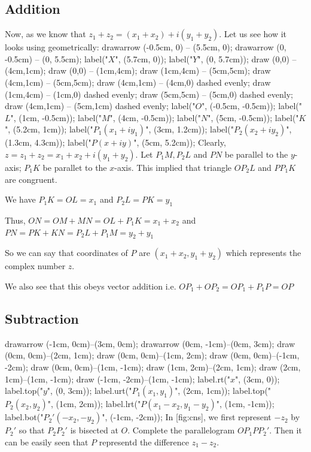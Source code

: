 \subsection{Addition}
Now, as we know that $z_1 + z_2 = (x_1 + x_2) + i(y_1 + y_2)$. Let us see how it looks using geometrically:
\startplacefigure[title=Complex numbers addition]
  \startMPcode
    drawarrow (-0.5cm, 0) -- (5.5cm, 0);
    drawarrow (0, -0.5cm) -- (0, 5.5cm);
    label("$X$", (5.7cm, 0));
    label("$Y$", (0, 5.7cm));
    draw (0,0) -- (4cm,1cm);
    draw (0,0) -- (1cm,4cm);
    draw (1cm,4cm) -- (5cm,5cm);
    draw (4cm,1cm) -- (5cm,5cm);
    draw (4cm,1cm) -- (4cm,0) dashed evenly;
    draw (1cm,4cm) -- (1cm,0) dashed evenly;
    draw (5cm,5cm) -- (5cm,0) dashed evenly;
    draw (4cm,1cm) -- (5cm,1cm) dashed evenly;
    label("$O$", (-0.5cm, -0.5cm));
    label("$L$", (1cm, -0.5cm));
    label("$M$", (4cm, -0.5cm));
    label("$N$", (5cm, -0.5cm));
    label("$K$", (5.2cm, 1cm));
    label("$P_1(x_1 + iy_1)$", (3cm, 1.2cm));
    label("$P_2(x_2 + iy_2)$", (1.3cm, 4.3cm));
    label("$P(x + iy)$", (5cm, 5.2cm));
  \stopMPcode
\stopplacefigure
Clearly, $z = z_1 + z_2 = x_1 + x_2 + i(y_1 + y_2)$. Let $P_1M, P_2L$ and $PN$ be parallel to the $y$-axis; $P_1K$ be parallet to
the $x$-axis. This implied that triangle $OP_2L$ and $PP_1K$ are congruent.

We have $P_1K = OL = x_1$ and $P_2L = PK = y_1$

Thus, $ON = OM + MN = OL + P_1K = x_1 + x_2$ and $PN = PK + KN = P_2L + P_1M = y_2 + y_1$

So we can say that coordinates of $P$ are $(x_1 + x_2, y_1 + y_2)$ which represents the complex number $z.$

We also see that this obeys vector addition i.e. $OP_1 + OP_2 = OP_1 + P_1P = OP$

\subsection{Subtraction}
\startplacefigure[title={Complex numbers subtraction},reference=fig:cns]
  \startMPcode
    drawarrow (-1cm, 0cm)--(3cm, 0cm);
    drawarrow (0cm, -1cm)--(0cm, 3cm);
    draw (0cm, 0cm)--(2cm, 1cm);
    draw (0cm, 0cm)--(1cm, 2cm);
    draw (0cm, 0cm)--(-1cm, -2cm);
    draw (0cm, 0cm)--(1cm, -1cm);
    draw (1cm, 2cm)--(2cm, 1cm);
    draw (2cm, 1cm)--(1cm, -1cm);
    draw (-1cm, -2cm)--(1cm, -1cm);
    label.rt("$x$", (3cm, 0));
    label.top("$y$", (0, 3cm));
    label.urt("$P_1(x_1, y_1)$", (2cm, 1cm));
    label.top("$P_2(x_2, y_2)$", (1cm, 2cm));
    label.lrt("$P(x_1 - x_2, y_1 - y_2)$", (1cm, -1cm));
    label.bot("$P_2'(-x_2,- y_2)$", (-1cm, -2cm));
  \stopMPcode
\stopplacefigure
In  [fig:cns], we first represent $-z_2$ by $P_2'$ so that  $P_2P_2'$ is bisected at $O.$ Complete the parallelogram $OP_1PP_2'.$ Then it can be
easily seen that $P$  representd the difference $z_1 - z_2.$

